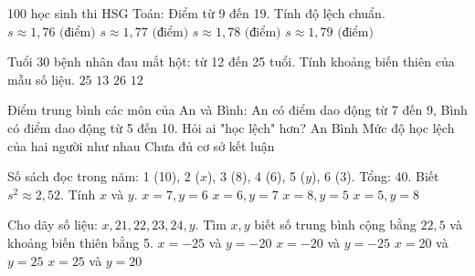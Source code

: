 \begin{ex}
	100 học sinh thi HSG Toán: Điểm từ 9 đến 19. Tính độ lệch chuẩn.
	\choice
	{$s \approx 1{,}76\text{ (điểm)}$}
	{\True $s \approx 1{,}77\text{ (điểm)}$}
	{$s \approx 1{,}78\text{ (điểm)}$}
	{$s \approx 1{,}79\text{ (điểm)}$}
\end{ex}

\begin{ex}
	Tuổi 30 bệnh nhân đau mắt hột: từ 12 đến 25 tuổi. Tính khoảng biến thiên của mẫu số liệu.
	\choice
	{$25$}
	{\True $13$}
	{$26$}
	{$12$}
\end{ex}

\begin{ex}
	Điểm trung bình các môn của An và Bình: An có điểm dao động từ 7 đến 9, Bình có điểm dao động từ 5 đến 10. Hỏi ai "học lệch" hơn?
	\choice
	{An}
	{\True Bình}
	{Mức độ học lệch của hai người như nhau}
	{Chưa đủ cơ sở kết luận}
\end{ex}

\begin{ex}
	Số sách đọc trong năm: 1 (10), 2 ($x$), 3 (8), 4 (6), 5 ($y$), 6 (3). Tổng: 40. Biết $s^2 \approx 2{,}52$. Tính $x$ và $y$.
	\choice
	{\True $x = 7, y = 6$}
	{$x = 6, y = 7$}
	{$x = 8, y = 5$}
	{$x = 5, y = 8$}
\end{ex}

\begin{ex}
	Cho dãy số liệu: $x, 21, 22, 23, 24, y$. Tìm $x, y$ biết số trung bình cộng bằng $22{,}5$ và khoảng biến thiên bằng 5.
	\choice
	{$x = -25$ và $y = -20$}
	{$x = -20$ và $y = -25$}
	{\True $x = 20$ và $y = 25$}
	{$x = 25$ và $y = 20$}
\end{ex}

